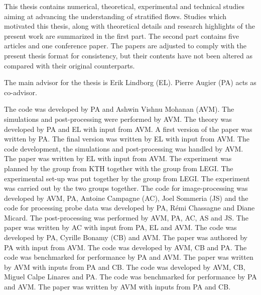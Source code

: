 %
\begin{preface}
    This thesis contains numerical, theoretical, experimental and
    technical studies aiming at advancing the understanding of stratified flows.
    Studies which motivated this thesis, along with theoretical
    details and research highlights of the present work are summarized in the
    first part. The second part contains five articles and one conference
    paper.
    The papers are adjusted to comply with the present thesis format for
    consistency, but their contents have not been altered as compared with their
    original counterparts.
\end{preface}


%
\begin{divisionofwork}
	The main advisor for the thesis is Erik Lindborg (EL).
    Pierre Augier (PA) acts as co-advisor.

	\paperitem
        The code was developed by PA and Ashwin Vishnu
        Mohanan (AVM). The simulations and post-processing were performed
        by AVM. The theory was developed by PA and EL with input from AVM. A
        first version of the paper was written by PA. The final version was
        written by EL with input from AVM.
	\paperitem
        The code development, the simulations and post-processing was
        handled by AVM. The paper was written by EL with input from
        AVM.
    \paperitem
        The experiment was planned by the group from KTH together with the group from
        LEGI. The experimental set-up was put together by
        the group from LEGI. The experiment was carried out by the two groups
        together.
        The code for image-processing was developed by AVM, PA, Antoine
        Campagne (AC), Joel Sommeria (JS) and the code for processing
        probe data was developed by PA, R\'emi Chassagne and Diane Micard. The
        post-processing was performed by AVM, PA, AC, AS and JS.
        The paper was written by AC with input from PA, EL and AVM.
    \paperitem
        The code was developed by PA, Cyrille Bonamy (CB) and AVM. The paper
        was authored by PA with input from AVM.
    \paperitem
        The code was developed by AVM, CB and PA.
        The code was benchmarked for performance by PA and AVM.
        The paper was written by AVM with inputs from PA and CB.
    \paperitem
        The code was developed by AVM, CB, Miguel Calpe Linares and PA.
        The code was benchmarked for performance by PA and AVM.
        The paper was written by AVM with inputs from PA and CB.

\end{divisionofwork}


